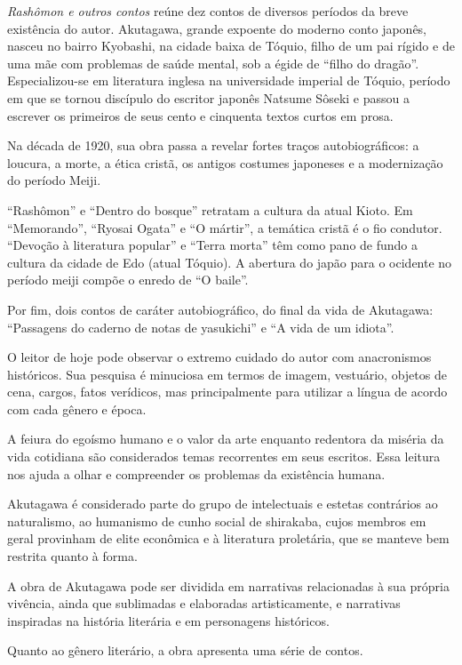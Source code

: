 \documentclass[12pt]{extarticle}
\begin{document}
\textit{Rashômon e outros contos} reúne dez contos de diversos períodos da breve
existência do autor. Akutagawa, grande expoente do moderno conto japonês, nasceu no bairro
Kyobashi, na cidade baixa de Tóquio, filho de um pai rígido e de uma mãe com problemas
de saúde mental, sob a égide de “filho do dragão''. Especializou-se em 
literatura inglesa na universidade imperial de Tóquio,
período em que se tornou discípulo do escritor japonês Natsume Sôseki e passou
a escrever os primeiros de seus cento e cinquenta textos curtos em prosa.
 
Na década de 1920, sua obra passa a revelar fortes traços
autobiográficos: a loucura, a morte, a ética cristã, os antigos costumes
japoneses e a modernização do período Meiji. 

“Rashômon” e “Dentro do bosque” retratam a cultura da atual Kioto. Em
“Memorando”, “Ryosai Ogata'' e “O mártir”, a temática cristã é o fio
condutor. “Devoção à literatura popular” e “Terra morta” têm como pano de fundo a cultura
da cidade de Edo (atual Tóquio). A abertura do japão para o ocidente no período meiji
compõe o enredo de “O baile”.
 
Por fim, dois contos de caráter autobiográfico, do final da vida de
Akutagawa: “Passagens do caderno de notas de yasukichi” e “A vida de um
idiota”.

O leitor de hoje pode observar o extremo cuidado do autor com anacronismos
históricos. Sua pesquisa é minuciosa em termos de imagem, vestuário, objetos
de cena, cargos, fatos verídicos, mas principalmente para utilizar a língua
de acordo com cada gênero e época.
 
A feiura do egoísmo humano e o valor da arte enquanto redentora da miséria da
vida cotidiana são considerados temas recorrentes em seus escritos.
Essa leitura nos ajuda a olhar e compreender os problemas da existência humana.
 
Akutagawa é considerado parte do grupo de intelectuais e estetas contrários ao
naturalismo, ao humanismo de cunho social de shirakaba, cujos membros em
geral provinham de elite econômica e à literatura proletária, que se manteve
bem restrita quanto à forma.
 
A obra de Akutagawa pode ser dividida em narrativas relacionadas à sua própria
vivência, ainda que sublimadas e elaboradas artisticamente, e narrativas
inspiradas na história literária e em personagens históricos.
 
Quanto ao gênero literário, a obra apresenta uma série de contos.
 
\end{document}
